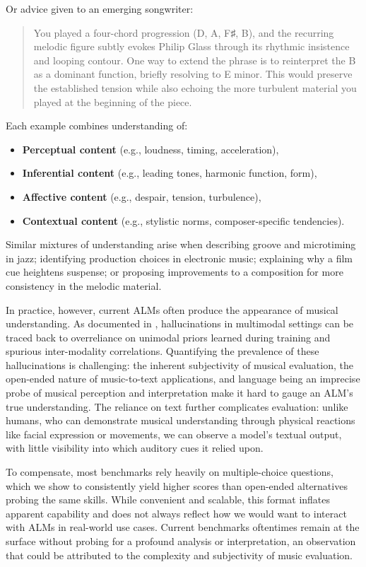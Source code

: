 \documentclass[conference,a4paper]{APSIPA2026}
\begin{document}
Or advice given to an emerging songwriter:

\begin{quote}
You played a four-chord progression (D, A, F♯, B), and the recurring melodic figure subtly evokes Philip Glass through its rhythmic insistence and looping contour. One way to extend the phrase is to reinterpret the B as a dominant function, briefly resolving to E minor. This would preserve the established tension while also echoing the more turbulent material you played at the beginning of the piece.
\end{quote}

Each example combines understanding of:

\begin{itemize}
    \item \textbf{Perceptual content} (e.g., loudness, timing, acceleration),
    \item \textbf{Inferential content} (e.g., leading tones, harmonic function, form),
    \item \textbf{Affective content} (e.g., despair, tension, turbulence),
    \item \textbf{Contextual content} (e.g., stylistic norms, composer-specific tendencies).
\end{itemize}

Similar mixtures of understanding arise when describing groove and microtiming in jazz; identifying production choices in electronic music; explaining why a film cue heightens suspense; or proposing improvements to a composition for more consistency in the melodic material.

In practice, however, current ALMs often produce the appearance of musical understanding. As documented in \cite{leng2024curse}, hallucinations in multimodal settings can be traced back to overreliance on unimodal priors learned during training and spurious inter-modality correlations. Quantifying the prevalence of these hallucinations is challenging: the inherent subjectivity of musical evaluation, the open-ended nature of music-to-text applications, and language being an imprecise probe of musical perception and interpretation make it hard to gauge an ALM's true understanding. The reliance on text further complicates evaluation: unlike humans, who can demonstrate musical understanding through physical reactions like facial expression or movements, we can observe a model’s textual output, with little visibility into which auditory cues it relied upon.

To compensate, most benchmarks rely heavily on multiple-choice questions, which we show to consistently yield higher scores than open-ended alternatives probing the same skills. While convenient and scalable, this format inflates apparent capability and does not always reflect how we would want to interact with ALMs in real-world use cases. Current benchmarks oftentimes remain at the surface without probing for a profound analysis or interpretation, an observation that could be attributed to the complexity and subjectivity of music evaluation.
\end{document}
